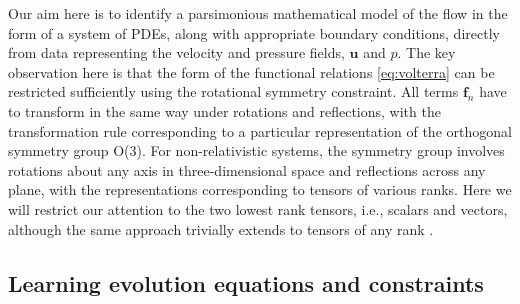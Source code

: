 \documentclass[preprint]{article}
\def\bi#1{\textbf{#1}}
\begin{document}
Our aim here is to identify a parsimonious mathematical model of the flow in the form of a system of PDEs, along with appropriate boundary conditions, directly from data representing the velocity and pressure fields, ${\bi u}$ and $p$. The key observation here is that the form of the functional relations \eqref{eq:volterra} can be restricted sufficiently using the rotational symmetry constraint. All terms ${\bi f}_n$ have to transform in the same way under rotations and reflections, with the transformation rule corresponding to a particular representation of the orthogonal symmetry group O(3). For non-relativistic systems, the symmetry group involves rotations about any axis in three-dimensional space and reflections across any plane, with the representations corresponding to tensors of various ranks. Here we will restrict our attention to the two lowest rank tensors, i.e., scalars and vectors, although the same approach trivially extends to tensors of any rank \citep{golden2023}.  

\subsection{Learning evolution equations and constraints}
\end{document}

